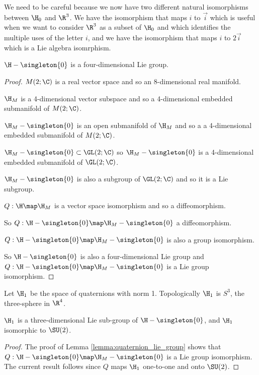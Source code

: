 \documentclass[oneside,12pt]{amsart}
\begin{document}
\begin{remark}
We need to be careful because we now have two different natural isomorphisms between $\H_0$ and $\R^{3}$.
We have the isomorphism that maps $i$ to $\vec{i}$ which is useful when we want to consider $\R^3$ as a subset of
$\H_0$ and which identifies the multiple
uses of the letter $i$, and we have the isomorphism that maps $i$ to $2\vec{i}$ which is a Lie algebra isomrphism.
\end{remark}

\begin{lemma}
\label{lemma:quaternion_lie_group}
$\H -\singleton{0}$ is a four-dimensional Lie group.
\end{lemma}
\begin{proof}
$M(2; \C)$ is a real vector space and so an 8-dimensional real manifold. 

$\H_M$ is a 4-dimensional vector subspace and so a 4-dimensional embedded submanifold of $M(2; \C)$.

$\H_M- \singleton{0}$ is an open submanifold of $\H_M$ and so a a 4-dimensional embedded submanifold of $M(2; \C)$.


$\H_M- \singleton{0}\subset \GL(2;\C)$ so $\H_M- \singleton{0}$ is a 4-dimensional embedded submanifold of $\GL(2;\C)$.


$\H_M- \singleton{0}$ is also a subgroup of $\GL(2;\C)$ and so it is a Lie subgroup.

$Q:\H\map\H_M$ is a vector space isomorphism and so a diffeomorphism.

So $Q:\H - \singleton{0}\map\H_M- \singleton{0}$ a diffeomorphism.

$Q:\H- \singleton{0}\map\H_M- \singleton{0}$ is also a group isomorphism.

So $\H - \singleton{0}$ is also a four-dimensional Lie group and $Q:\H-\singleton{0}\map\H_M-\singleton{0}$
 is a Lie group isomorphism.
\end{proof}


\begin{definition}
Let $\H_1$ be the space of quaternions with norm 1. Topologically $\H_1$ is $S^3$, the three-sphere in $\R^4$.
\end{definition}

\begin{corollary}
\label{corollary:h_1_lie_subgroup}
$\H_1$ is a three-dimensional Lie sub-group of $\H-\singleton{0}$, and $\H_1$ isomorphic to $\SU(2)$.
\end{corollary}
\begin{proof}
The proof of Lemma \ref{lemma:quaternion_lie_group} shows that $Q:\H-\singleton{0}\map\H_M-\singleton{0}$
is a Lie group isomorphism. The current result follows since
$Q$ maps $\H_1$ one-to-one and onto $\SU(2)$.
\end{proof}
\end{document}
